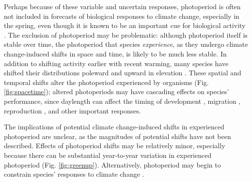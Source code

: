 \documentclass{article}
\begin{document}
\par Perhaps because of these variable and uncertain responses, photoperiod is often not included in forecasts of biological responses to climate change, especially in the spring, even though it is known to be an important cue for biological activity \citep[but see ][]{duputie2015,grevstad2015,Caffarra:2011qf}. The exclusion of photoperiod may be problematic: although photoperiod itself is stable over time, the photoperiod that species \emph{experience}, as they undergo climate change-induced shifts in space and time, is likely to be much less stable. In addition to shifting activity earlier with recent warming, many species have shifted their distributions poleward and upward in elevation \citep[i.e., range shifts,][]{chen2011,harsch2009,parmesan2006,penuelas2003}. These spatial and temporal shifts alter the photoperiod experienced by organisms (Fig. \ref{fig:spacetime}); altered photoperiods may have cascading effects on species' performance, since daylength can affect the timing of development \citep{grevstad2015,muir1994,tauber1975}, migration \citep{dawbin1966}, reproduction \citep{dunn2019,dardente2012,ben1997}, and other important responses. 

\par The implications of potential climate change-induced shifts in experienced photoperiod are unclear, as the magnitudes of potential shifts have not been described. Effects of photoperiod shifts may be relatively minor, especially because there can be substantial year-to-year variation in experienced photoperiod (Fig. \ref{fig:greenup}). Alternatively, photoperiod may begin to constrain species' responses to climate change \citep{fu2015,way2015,basler2012,koerner2010a}.
\end{document}
